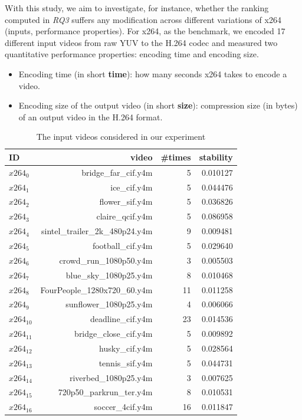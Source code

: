 With this study, we aim to investigate, for instance, whether the ranking computed in \textit{RQ3} suffers any modification across different variations of x264 (\ie inputs, performance properties). 
For x264, as the benchmark, we encoded 17 different input videos from raw YUV to the H.264 codec %
and measured two quantitative performance properties: encoding time and encoding size. %

\begin{itemize}
    \item Encoding time (in short \textbf{time}): how many seconds x264 takes to encode a video.
    \item Encoding size of the output video (in short \textbf{size}): compression size (in bytes) of an output video in the H.264 format.
\end{itemize}

\begin{table}[ht]
    \centering
    \begin{tabular}{lrrr}
        \toprule
            ID & video & \#times & stability \\
        \midrule
            $x264_{0}$ & bridge\_far\_cif.y4m & 5 & 0.010127 \\
            $x264_{1}$ & ice\_cif.y4m & 5 & 0.044476 \\
            $x264_{2}$ & flower\_sif.y4m & 5 & 0.036826 \\
            $x264_{3}$ & claire\_qcif.y4m & 5 & 0.086958 \\
            $x264_{4}$ & sintel\_trailer\_2k\_480p24.y4m & 9 & 0.009481 \\
            $x264_{5}$ & football\_cif.y4m & 5 & 0.029640 \\
            $x264_{6}$ & crowd\_run\_1080p50.y4m & 3 & 0.005503 \\
            $x264_{7}$ & blue\_sky\_1080p25.y4m & 8 & 0.010468 \\
            $x264_{8}$ & FourPeople\_1280x720\_60.y4m & 11 & 0.011258 \\
            $x264_{9}$ & sunflower\_1080p25.y4m & 4 & 0.006066 \\
            $x264_{10}$ & deadline\_cif.y4m & 23 & 0.014536 \\
            $x264_{11}$ & bridge\_close\_cif.y4m & 5 & 0.009892 \\
            $x264_{12}$ & husky\_cif.y4m & 5 & 0.028564 \\
            $x264_{13}$ & tennis\_sif.y4m & 5 & 0.044731 \\
            $x264_{14}$ & riverbed\_1080p25.y4m & 3 & 0.007625 \\
            $x264_{15}$ & 720p50\_parkrun\_ter.y4m & 8 & 0.010531 \\
            $x264_{16}$ & soccer\_4cif.y4m & 16 & 0.011847 \\
        \bottomrule
    \end{tabular}
    \caption{The input videos considered in our experiment}
    \label{tab:input_videos}
\end{table}

